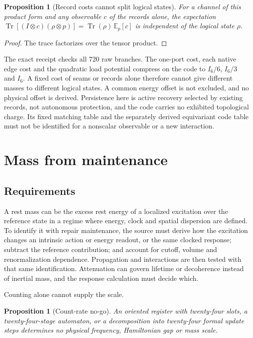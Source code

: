 \documentclass[11pt]{article}
\newtheorem{proposition}[theorem]{Proposition}
\begin{document}
\begin{proposition}[Record costs cannot split logical states]
\label{prop:record-cost-split}
For a channel of this product form and any observable \(c\) of the records
alone, the expectation \(\operatorname{Tr}[(I\otimes c)(\rho\otimes p)]
=\operatorname{Tr}(\rho)\,\mathbb E_p[c]\) is independent of the logical
state \(\rho\).
\end{proposition}

\begin{proof}
The trace factorizes over the tensor product.
\end{proof}

The exact receipt checks all 720 raw branches. The one-port cost, each
native edge cost and the quadratic load potential compress on the code to
\(I_6/6\), \(I_6/3\) and \(I_6\). A fixed cost of seams or records alone
therefore cannot give different masses to different logical states. A
common energy offset is not excluded, and no physical offset is derived.
Persistence here is active recovery selected by existing records, not
autonomous protection, and the code carries no exhibited topological charge.
Its fixed matching table and the separately derived equivariant code table
must not be identified for a nonscalar observable or a new interaction.

\section{Mass from maintenance}
\label{sec:mass-maintenance}

\subsection{Requirements}

A rest mass can be the excess rest energy of a localized excitation over the
reference state in a regime where energy, clock and spatial dispersion are
defined. To identify it with repair maintenance, the source must derive how
the excitation changes an intrinsic action or energy readout, or the same
clocked response; subtract the reference contribution; and account for
cutoff, volume and renormalization dependence. Propagation and interactions
are then tested with that same identification. Attenuation can govern
lifetime or decoherence instead of inertial mass, and the response
calculation must decide which.

Counting alone cannot supply the scale.

\begin{proposition}[Count-rate no-go]
An oriented register with twenty-four slots, a twenty-four-stage automaton,
or a decomposition into twenty-four formal update steps determines no
physical frequency, Hamiltonian gap or mass scale.
\end{proposition}
\end{document}
